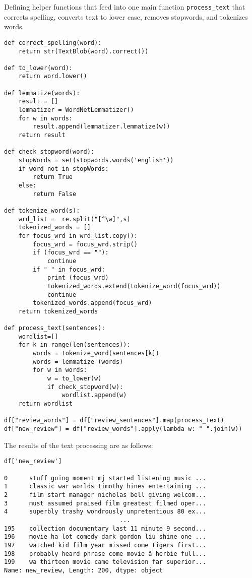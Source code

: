 \documentclass[12pt, letterpaper]{article}
\begin{document}
Defining helper functions that feed into one main function \texttt{process\_text} that corrects spelling, converts text to lower case, removes stopwords, and tokenizes words.

\begin{mdframed}[backgroundcolor=shadecolor]
\begin{verbatim}
def correct_spelling(word):
    return str(TextBlob(word).correct())

def to_lower(word):
    return word.lower()

def lemmatize(words):
    result = []
    lemmatizer = WordNetLemmatizer()
    for w in words:
        result.append(lemmatizer.lemmatize(w))
    return result

def check_stopword(word):
    stopWords = set(stopwords.words('english'))   
    if word not in stopWords:
        return True
    else:
        return False

def tokenize_word(s):
    wrd_list =  re.split("[^\w]",s)
    tokenized_words = []
    for focus_wrd in wrd_list.copy():
        focus_wrd = focus_wrd.strip()
        if (focus_wrd == ""):
            continue
        if " " in focus_wrd:
            print (focus_wrd)
            tokenized_words.extend(tokenize_word(focus_wrd))
            continue
        tokenized_words.append(focus_wrd)
    return tokenized_words

def process_text(sentences):
    wordlist=[]
    for k in range(len(sentences)):
        words = tokenize_word(sentences[k])    
        words = lemmatize (words) 
        for w in words:            
            w = to_lower(w)            
            if check_stopword(w):
                wordlist.append(w)
    return wordlist

df["review_words"] = df["review_sentences"].map(process_text)
df["new_review"] = df["review_words"].apply(lambda w: " ".join(w))

\end{verbatim}
\end{mdframed}

The results of the text processing are as follows:

\begin{verbatim}
df['new_review']

0      stuff going moment mj started listening music ...
1      classic war worlds timothy hines entertaining ...
2      film start manager nicholas bell giving welcom...
3      must assumed praised film greatest filmed oper...
4      superbly trashy wondrously unpretentious 80 ex...
                                ...                        
195    collection documentary last 11 minute 9 second...
196    movie ha lot comedy dark gordon liu shine one ...
197    watched kid film year missed come tigers first...
198    probably heard phrase come movie â herbie full...
199    wa thirteen movie came television far superior...
Name: new_review, Length: 200, dtype: object
\end{verbatim}
\end{document}
